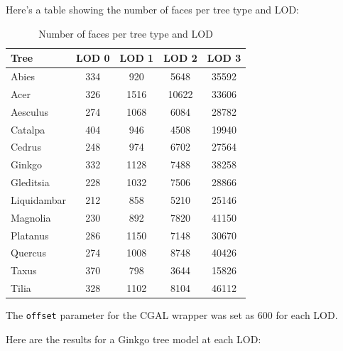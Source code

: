 \documentclass[12pt]{article}
\begin{document}
Here's a table showing the number of faces per tree type and LOD:

\begin{table}[h]
    \centering
    \begin{tabular}{|l|c|c|c|c|}
    \hline
    Tree & LOD 0 & LOD 1 & LOD 2 & LOD 3 \\
    \hline
    Abies & 334 & 920 & 5648 & 35592 \\
    Acer & 326 & 1516 & 10622 & 33606 \\
    Aesculus & 274 & 1068 & 6084 & 28782 \\
    Catalpa & 404 & 946 & 4508 & 19940 \\
    Cedrus & 248 & 974 & 6702 & 27564 \\
    Ginkgo & 332 & 1128 & 7488 & 38258 \\
    Gleditsia & 228 & 1032 & 7506 & 28866 \\
    Liquidambar & 212 & 858 & 5210 & 25146 \\
    Magnolia & 230 & 892 & 7820 & 41150 \\
    Platanus & 286 & 1150 & 7148 & 30670 \\
    Quercus & 274 & 1008 & 8748 & 40426 \\
    Taxus & 370 & 798 & 3644 & 15826 \\
    Tilia & 328 & 1102 & 8104 & 46112 \\
    \hline
    \end{tabular}
    \caption{Number of faces per tree type and LOD}
    \label{tab:my_label}
\end{table}

The \texttt{offset} parameter for the CGAL wrapper was set as 600 for each LOD.

Here are the results for a Ginkgo tree model at each LOD:
\end{document}
